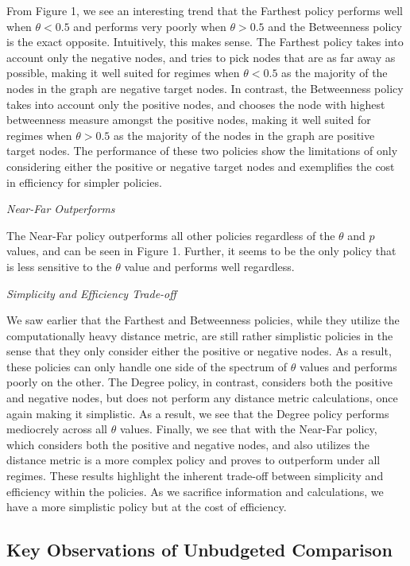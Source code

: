 From Figure 1, we see an interesting trend that the Farthest policy performs well when $\theta < 0.5$ and performs very poorly when $\theta > 0.5$ and the Betweenness policy is the exact opposite. Intuitively, this makes sense. The Farthest policy takes into account only the negative nodes, and tries to pick nodes that are as far away as possible, making it well suited for regimes when $\theta < 0.5$ as the majority of the nodes in the graph are negative target nodes. In contrast, the Betweenness policy takes into account only the positive nodes, and chooses the node with highest betweenness measure amongst the positive nodes, making it well suited for regimes when $\theta > 0.5$ as the majority of the nodes in the graph are positive target nodes. The performance of these two policies show the limitations of only considering either the positive or negative target nodes and exemplifies the cost in efficiency for simpler policies.

\textit{Near-Far Outperforms}

The Near-Far policy outperforms all other policies regardless of the $\theta$ and $p$ values, and can be seen in Figure 1. Further, it seems to be the only policy that is less sensitive to the $\theta$ value and performs well regardless. 

\textit{Simplicity and Efficiency Trade-off}

We saw earlier that the Farthest and Betweenness policies, while they utilize the computationally heavy distance metric, are still rather simplistic policies in the sense that they only consider either the positive or negative nodes. As a result, these policies can only handle one side of the spectrum of $\theta$ values and performs poorly on the other. The Degree policy, in contrast, considers both the positive and negative nodes, but does not perform any distance metric calculations, once again making it simplistic. As a result, we see that the Degree policy performs mediocrely across all $\theta$ values. Finally, we see that with the Near-Far policy, which considers both the positive and negative nodes, and also utilizes the distance metric is a more complex policy and proves to outperform under all regimes. These results highlight the inherent trade-off between simplicity and efficiency within the policies. As we sacrifice information and calculations, we have a more simplistic policy but at the cost of efficiency.

\subsection{Key Observations of Unbudgeted Comparison}

